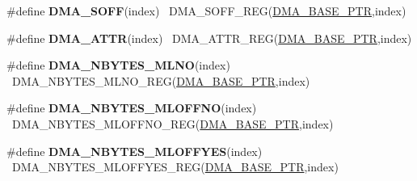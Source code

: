 \begin{DoxyCompactItemize}
\item 
\hypertarget{group___d_m_a___register___accessor___macros_ga4226c36621eb0b78bada4b3baf6d4217}{}\#define {\bfseries D\+M\+A\+\_\+\+S\+O\+F\+F}(index)                                                ~D\+M\+A\+\_\+\+S\+O\+F\+F\+\_\+\+R\+E\+G(\hyperlink{group___d_m_a___peripheral_ga6997fbc1b1973e9f27170217a3bd6f22}{D\+M\+A\+\_\+\+B\+A\+S\+E\+\_\+\+P\+T\+R},index)\label{group___d_m_a___register___accessor___macros_ga4226c36621eb0b78bada4b3baf6d4217}

\item 
\hypertarget{group___d_m_a___register___accessor___macros_ga8fe48f23e45251e54a47c2d46b8497d0}{}\#define {\bfseries D\+M\+A\+\_\+\+A\+T\+T\+R}(index)                                                ~D\+M\+A\+\_\+\+A\+T\+T\+R\+\_\+\+R\+E\+G(\hyperlink{group___d_m_a___peripheral_ga6997fbc1b1973e9f27170217a3bd6f22}{D\+M\+A\+\_\+\+B\+A\+S\+E\+\_\+\+P\+T\+R},index)\label{group___d_m_a___register___accessor___macros_ga8fe48f23e45251e54a47c2d46b8497d0}

\item 
\hypertarget{group___d_m_a___register___accessor___macros_gae50c68597fcb92147df281af64d0f414}{}\#define {\bfseries D\+M\+A\+\_\+\+N\+B\+Y\+T\+E\+S\+\_\+\+M\+L\+N\+O}(index)                                  ~D\+M\+A\+\_\+\+N\+B\+Y\+T\+E\+S\+\_\+\+M\+L\+N\+O\+\_\+\+R\+E\+G(\hyperlink{group___d_m_a___peripheral_ga6997fbc1b1973e9f27170217a3bd6f22}{D\+M\+A\+\_\+\+B\+A\+S\+E\+\_\+\+P\+T\+R},index)\label{group___d_m_a___register___accessor___macros_gae50c68597fcb92147df281af64d0f414}

\item 
\hypertarget{group___d_m_a___register___accessor___macros_ga584c5afb277cb16704f604b8fb7bfaa6}{}\#define {\bfseries D\+M\+A\+\_\+\+N\+B\+Y\+T\+E\+S\+\_\+\+M\+L\+O\+F\+F\+N\+O}(index)                            ~D\+M\+A\+\_\+\+N\+B\+Y\+T\+E\+S\+\_\+\+M\+L\+O\+F\+F\+N\+O\+\_\+\+R\+E\+G(\hyperlink{group___d_m_a___peripheral_ga6997fbc1b1973e9f27170217a3bd6f22}{D\+M\+A\+\_\+\+B\+A\+S\+E\+\_\+\+P\+T\+R},index)\label{group___d_m_a___register___accessor___macros_ga584c5afb277cb16704f604b8fb7bfaa6}

\item 
\hypertarget{group___d_m_a___register___accessor___macros_ga9ac529dfba824f38b984a8d4ffab793e}{}\#define {\bfseries D\+M\+A\+\_\+\+N\+B\+Y\+T\+E\+S\+\_\+\+M\+L\+O\+F\+F\+Y\+E\+S}(index)                          ~D\+M\+A\+\_\+\+N\+B\+Y\+T\+E\+S\+\_\+\+M\+L\+O\+F\+F\+Y\+E\+S\+\_\+\+R\+E\+G(\hyperlink{group___d_m_a___peripheral_ga6997fbc1b1973e9f27170217a3bd6f22}{D\+M\+A\+\_\+\+B\+A\+S\+E\+\_\+\+P\+T\+R},index)\label{group___d_m_a___register___accessor___macros_ga9ac529dfba824f38b984a8d4ffab793e}


\end{DoxyCompactItemize}

